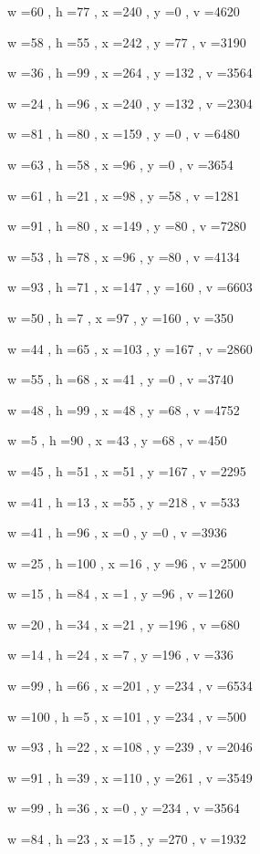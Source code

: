 \documentclass[11pt]{article}
\begin{document}
w =60 , h =77 , x =240 , y =0 , v =4620
\par
w =58 , h =55 , x =242 , y =77 , v =3190
\par
w =36 , h =99 , x =264 , y =132 , v =3564
\par
w =24 , h =96 , x =240 , y =132 , v =2304
\par
w =81 , h =80 , x =159 , y =0 , v =6480
\par
w =63 , h =58 , x =96 , y =0 , v =3654
\par
w =61 , h =21 , x =98 , y =58 , v =1281
\par
w =91 , h =80 , x =149 , y =80 , v =7280
\par
w =53 , h =78 , x =96 , y =80 , v =4134
\par
w =93 , h =71 , x =147 , y =160 , v =6603
\par
w =50 , h =7 , x =97 , y =160 , v =350
\par
w =44 , h =65 , x =103 , y =167 , v =2860
\par
w =55 , h =68 , x =41 , y =0 , v =3740
\par
w =48 , h =99 , x =48 , y =68 , v =4752
\par
w =5 , h =90 , x =43 , y =68 , v =450
\par
w =45 , h =51 , x =51 , y =167 , v =2295
\par
w =41 , h =13 , x =55 , y =218 , v =533
\par
w =41 , h =96 , x =0 , y =0 , v =3936
\par
w =25 , h =100 , x =16 , y =96 , v =2500
\par
w =15 , h =84 , x =1 , y =96 , v =1260
\par
w =20 , h =34 , x =21 , y =196 , v =680
\par
w =14 , h =24 , x =7 , y =196 , v =336
\par
w =99 , h =66 , x =201 , y =234 , v =6534
\par
w =100 , h =5 , x =101 , y =234 , v =500
\par
w =93 , h =22 , x =108 , y =239 , v =2046
\par
w =91 , h =39 , x =110 , y =261 , v =3549
\par
w =99 , h =36 , x =0 , y =234 , v =3564
\par
w =84 , h =23 , x =15 , y =270 , v =1932
\par
\newpage
\end{document}
